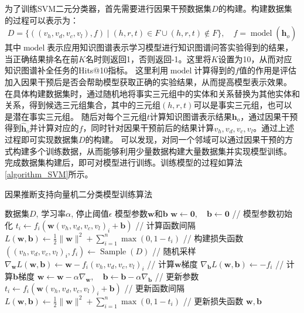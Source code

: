 \documentclass[algorithmlist, AutoFakeBold, AutoFakeSlant, figurelist, tablelist, nomlist, engineering]{seuthesix}
\begin{document}
为了训练SVM二元分类器，首先需要进行因果干预数据集$D$的构建。构建数据集的过程可以表示为：
\begin{equation}
  D = \{((v_h, v_d, v_c, v_l), f) \mid (h, r, t) \in F \cup (h, r, t) \notin F\},\quad f = \operatorname{model}(\bm{\hat{h}}_o)
\end{equation}
其中$\operatorname{model}$表示应用知识图谱表示学习模型进行知识图谱问答实验得到的结果，当正确结果排名在前$K$名时则返回1，否则返回-1。这里将$K$设置为10，从而对应知识图谱补全任务的Hits@10指标。
这里利用$\operatorname{model}$计算得到的$f$值的作用是评估加入因果干预后是否会帮助模型获取正确的实验结果，从而提高模型表示效果。
在具体构建数据集时，通过随机地将事实三元组中的实体和关系替换为其他实体和关系，得到候选三元组集合，其中的三元组$(h, r, t)$可以是事实三元组，也可以是潜在事实三元组。
随后对每个三元组$t$计算知识图谱表示结果$\bm{h}_o$，通过因果干预得到$\bm{\hat{h}}_o$并计算对应的$f$，同时针对因果干预前后的结果计算$v_h, v_d, v_c, v_l$。通过上述过程即可实现数据集$D$的构建。
可以发现，对同一个邻域可以通过因果干预的方式构建多个训练数据，从而能够利用少量数据构建大量数据集并实现模型训练。
完成数据集构建后，即可对模型进行训练。训练模型的过程如算法\ref{algorithm_SVM}所示。
\begin{algorithm}[tb]
	\caption{因果推断支持向量机二分类模型训练算法}
	\label{algorithm_SVM}
	\begin{algorithmic}[1]
    \Require 数据集$D$, 学习率$\alpha$, 停止阈值$\epsilon$
    \Ensure 模型参数$\bm{w}$和$\bm{b}$
    \State $\bm{w} \leftarrow \bm{0},\quad \bm{b} \leftarrow \bm{0}$ // 模型参数初始化
    \State $t_i \leftarrow f_i (\bm{w} (v_h, v_d, v_c, v_l)_i + \bm{b})$ // 计算函数间隔
    \State $L(\bm{w}, \bm{b}) \leftarrow \frac{1}{2} \|\bm{w}\|^2 + \sum_{i=1}^{n} \max(0, 1 - t_i)$ // 构建损失函数
    \EndFor
    \Repeat
    \State $((v_h, v_d, v_c, v_l)_i, f_i) \leftarrow \operatorname{Sample}(D)$ // 随机采样
    \State $\nabla_{\bm{w}} L(\bm{w}, \bm{b}) \leftarrow \bm{w} - f_i (v_h, v_d, v_c, v_l)_i$ // 计算$\bm{w}$梯度
    \State $\nabla_{\bm{b}} L(\bm{w}, \bm{b}) \leftarrow - f_i$ // 计算$\bm{b}$梯度
    \State $\bm{w} \leftarrow \bm{w} - \alpha \nabla_{\bm{w}},\quad \bm{b} \leftarrow \bm{b} - \alpha \nabla_{\bm{b}}$ // 更新参数
    \State $t_i \leftarrow f_i (\bm{w} (v_h, v_d, v_c, v_l)_i + \bm{b})$ // 更新函数间隔
    \State $L(\bm{w}, \bm{b}) \leftarrow \frac{1}{2} \|\bm{w}\|^2 + \sum_{i=1}^{n} \max(0, 1 - t_i)$ // 更新损失函数
    \EndIf
    \State \Return $\bm{w}, \bm{b}$
	\end{algorithmic}
\end{algorithm} 
\end{document}
